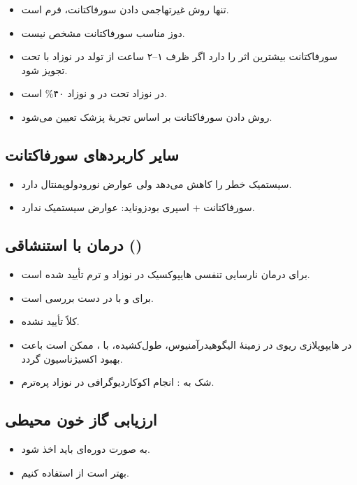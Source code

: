 \documentclass[12pt,a4paper]{article}
\begin{document}
\begin{itemize}
\item تنها روش غیرتهاجمی دادن سورفاکتانت، فرم  است.
\item دوز مناسب سورفاکتانت  مشخص نیست.
\item سورفاکتانت بیشترین اثر را دارد اگر ظرف ۱–۲ ساعت از تولد در نوزاد با  تحت  تجویز شود.
\item در نوزاد تحت  در  و نوزاد  ۴۰\% است.
\item روش دادن سورفاکتانت بر اساس تجربهٔ پزشک تعیین می‌شود.
\end{itemize}
\subsection*{سایر کاربردهای سورفاکتانت}
\begin{itemize}
\item {} سیستمیک خطر  را کاهش می‌دهد ولی عوارض نورودولوپمنتال دارد.
\item سورفاکتانت + اسپری بودزوناید: عوارض سیستمیک ندارد.
\end{itemize}
\subsection*{درمان با  استنشاقی ()}
\begin{itemize}
\item برای درمان نارسایی تنفسی هایپوکسیک در نوزاد  و ترم تأیید شده است.
\item برای  و  با  در دست بررسی است.
\item کلاً تأیید نشده.
\item در هایپوپلازی ریوی در زمینهٔ الیگوهیدرآمنیوس،  طول‌کشیده،  با ، ممکن است باعث بهبود اکسیژناسیون گردد.
\item شک به : انجام اکوکاردیوگرافی در نوزاد پره‌ترم.
\end{itemize}
\subsection*{ارزیابی گاز خون محیطی}
\begin{itemize}
\item به صورت دوره‌ای باید  اخذ شود.
\item بهتر است از  استفاده کنیم.
\end{itemize}
\end{document}
